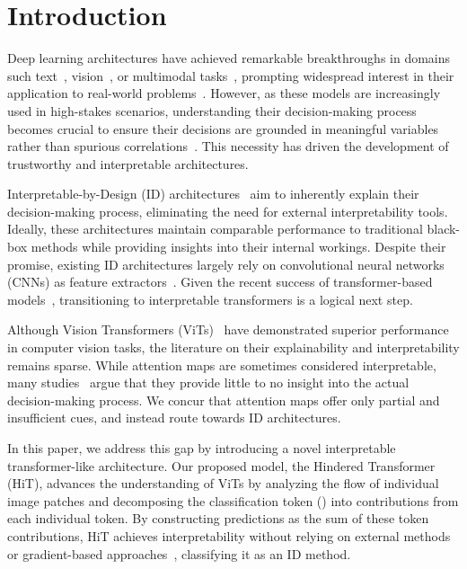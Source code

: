 \section{Introduction}
Deep learning architectures have achieved remarkable breakthroughs in domains such text~\cite{Dubey2024TheL3}, vision~\cite{oquab2024dinov,esser2024scaling}, or multimodal tasks~\cite{NEURIPS2023_6dcf277e}, prompting widespread interest in their application to real-world problems~\cite{li2023llavamed}. However, as these models are increasingly used in high-stakes scenarios, understanding their decision-making process becomes crucial to ensure their decisions are grounded in meaningful variables rather than spurious correlations~\cite{Jeanneret_2022_ACCV,augustin2022diffusion}. This necessity has driven the development of trustworthy and interpretable architectures.

Interpretable-by-Design (ID) architectures~\cite{NEURIPS2019_adf7ee2d} aim to inherently explain their decision-making process, eliminating the need for external interpretability tools. Ideally, these architectures maintain comparable performance to traditional black-box methods while providing insights into their internal workings. Despite their promise, existing ID architectures largely rely on convolutional neural networks (CNNs) as feature extractors~\cite{wang2023learning,Boehle2022CVPR,pmlr-v119-koh20a,oikarinen2023labelfree}. Given the recent success of transformer-based models~\cite{dosovitskiy2021an}, transitioning to interpretable transformers is a logical next step.

Although Vision Transformers (ViTs)~\cite{dosovitskiy2021an} have demonstrated superior performance in computer vision tasks, the literature on their explainability and interpretability remains sparse. While attention maps are sometimes considered interpretable, many studies~\cite{serrano-smith-2019-attention,Jain2019AttentionIN} argue that they provide little to no insight into the actual decision-making process. 
We concur that attention maps offer only partial and insufficient cues, and instead route towards ID architectures.

In this paper, we address this gap by introducing a novel interpretable transformer-like architecture. Our proposed model, the Hindered Transformer (HiT), advances the understanding of ViTs by analyzing the flow of individual image patches and decomposing the classification token (\CLS) into contributions from each individual token. By constructing predictions as the sum of these token contributions, HiT achieves interpretability without relying on external methods~\cite{alain2016understanding} or gradient-based approaches~\cite{simonyan2013deep}, classifying it as an ID method.



